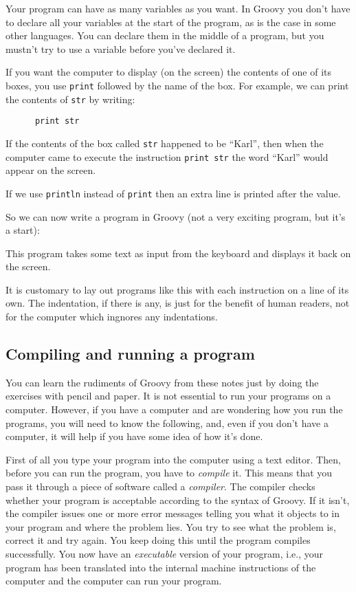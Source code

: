 Your program can have as many variables as you want.  In Groovy you don't
have to declare all your variables at the start of the program, as is the
case in some other languages.  You can declare them in the middle of a
program, but you mustn't try to use a variable before you've declared it.

If you want the computer to display (on the screen) the contents of one of
its boxes, you use \verb!print! followed by the name
of the box.  For example, we can print the contents of \verb!str! by writing:

\begin{Verbatim}
      print str
\end{Verbatim}

If the contents of the box called \verb!str! happened to be ``Karl'', then when the
computer came to execute the instruction \verb!print str! the word ``Karl'' would appear
on the screen.  

If we use \verb!println! instead of \verb!print! then an extra line is
printed after the value. 

So we can now write a program in Groovy (not a very exciting program,
but it's a start):


This program takes some text as input from the keyboard and displays it
back on the screen.

It is customary to lay out programs like this with each instruction on a line 
of its own. The indentation, if there is any, is just for the benefit
of human readers, not for the computer which ingnores any indentations. 

\subsection{Compiling and running a program}

You can learn the rudiments of Groovy from these notes just by doing the
exercises with pencil and paper.  It is not essential to run your programs
on a computer.  However, if you have a computer and are wondering how
you run the programs, you will need to know the following, and, even if you don't have
a computer, it will help if you have some idea of how it's done.

First of all you type your program into the computer using a text
editor. Then, 
before you can run the program, you have to \emph{compile} it.  This means that
you pass it through a piece
of software called a \emph{compiler}.  The compiler checks whether your program
is acceptable according to the syntax of Groovy.  If it isn't, the compiler
issues one or more error messages telling you
what it objects to in your program and where the problem lies.
You try to see what the problem is, correct it and try again.  You keep
doing this until the program compiles successfully.  You now have an
{\em executable} version of your program, i.e., your program has been translated
into the internal machine instructions of the computer and the computer
can run your program.

